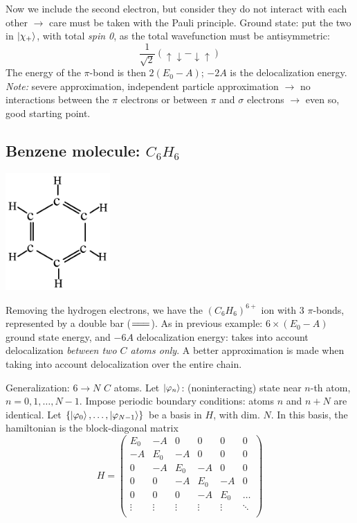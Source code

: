 \documentclass[12pt]{article}
\begin{document}
Now we include the second electron, but consider they
do not interact with each other 
$\to$ care must be taken with the Pauli principle.
Ground state: put the two in $\ket{\chi_{+}}$, with
total \emph{spin 0}, as the total wavefunction
must be antisymmetric:
\[
\frac{1}{\sqrt{2}}
\left(
\uparrow \downarrow-\downarrow \uparrow
\right)
\]
The energy of the $\pi$-bond is then $2(E_0-A)$; 
$-2A$ is the delocalization energy.
\emph{Note:} severe approximation, independent particle
approximation $\to$ no interactions between the
$\pi$ electrons or between $\pi$ and $\sigma$ electrons 
$\to$ even so, good starting point. 


\subsection{Benzene molecule: $C_6H_6$}

\begin{center}
\includegraphics[width=0.3\textwidth]{Figures/benzene.pdf}
\end{center}
Removing the hydrogen electrons, we have the $(C_6H_6)^{6+}$ ion
with 3 $\pi$-bonds, represented by a double bar ($=\joinrel=\joinrel=$).
As in previous example: $6\times(E_0-A)$ ground state energy,
and $-6A$ delocalization energy: takes into account
delocalization \emph{between two $C$ atoms only}.
A better approximation is made when taking into
account delocalization over the entire chain.

Generalization: $6 \to N$ $C$ atoms.
Let $\ket{\varphi_n}$: (noninteracting) state near $n$-th atom,
$n=0,1,\ldots,N-1$.
Impose periodic boundary conditions: atoms $n$ and $n+N$
are identical. Let
$\{\ket{\varphi_0},\ldots,\ket{\varphi_{N-1}}\}$ be a basis in $H$, with dim. $N$. 
In this basis, the hamiltonian is the block-diagonal matrix
\[
H=
\left(
\begin{array}{rrrrrr}
 E_{0} & -A & 0 & 0 & 0 & 0 \\ 
-A & E_{0} & -A & 0 & 0 & 0 \\ 
0 & -A & E_{0} & -A & 0 & 0 \\ 
0 & 0 & -A & E_{0} & -A & 0 \\ 
0 & 0 & 0 & -A & E_{0} & \ldots \\
\vdots & \vdots & \vdots& \vdots & \vdots & \ddots \\
\end{array}
\right)
\]
\end{document}
